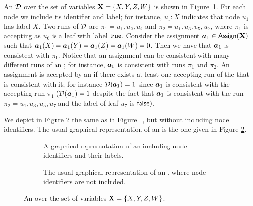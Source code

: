 \begin{example}
  An \nbdd $\mathcal{D}$ over the set of variables $\mathbf{X} = \{X,Y,Z,W\}$ is shown in Figure~\ref{fig-nbdd-with-id}. For each node we include its identifier and label; for instance, $u_1 : X$ indicates that node $u_1$ has label $X$. Two runs of $\mathcal{D}$ are $\pi_1 = u_1,u_2,u_6$ and $\pi_2 = u_1, u_3, u_5, u_7$, where $\pi_1$ is accepting as $u_6$ is a leaf with label $\mathsf{true}$. Consider the assignment $\boldsymbol{a}_1 \in \mathsf{Assign}(\mathbf{X})$ such that $\boldsymbol{a}_1(X) = \boldsymbol{a}_1(Y) = \boldsymbol{a}_1(Z) = \boldsymbol{a}_1(W) = 0$. Then we have that $\boldsymbol{a}_1$ is consistent with $\pi_1$. Notice that an assignment can be consistent with many different runs of an \nbdd; for instance, $\boldsymbol{a}_1$ is consistent with runs $\pi_1$ and $\pi_2$. An assignment is accepted by an \nbdd if there exists at least one accepting run of the \nbdd that is consistent with it; for instance $\mathcal{D}(\boldsymbol{a}_1) = 1$ since $\boldsymbol{a}_1$ is consistent with the accepting run $\pi_1$ $(\mathcal{D}(\boldsymbol{a}_1) = 1$ despite the fact that $\boldsymbol{a}_1$ is consistent with the run $\pi_2 = u_1, u_3, u_5, u_7$ and the label of leaf $u_7$ is $\mathsf{false})$. 

We depict in Figure \ref{fig-nbdd-without-id} the same \nbdd as in Figure \ref{fig-nbdd-with-id}, but without including node identifiers. The usual graphical representation of an \nbdd is the one given in  Figure \ref{fig-nbdd-without-id}.
\end{example}

\begin{figure}
\begin{center}
\begin{subfigure}{0.45\textwidth}

\caption{A graphical representation of an \nbdd including node identifiers and their labels.}
\label{fig-nbdd-with-id}
\end{subfigure}
\hspace{5mm}
\begin{subfigure}{0.45\textwidth}

\caption{The usual graphical representation of an \nbdd, where node identifiers are not included.}
\label{fig-nbdd-without-id}
\end{subfigure}
\end{center}
\caption{An \nbdd over the set of variables $\mathbf{X} = \{X,Y,Z,W\}$. \label{fig-nbdd}}
\end{figure}

